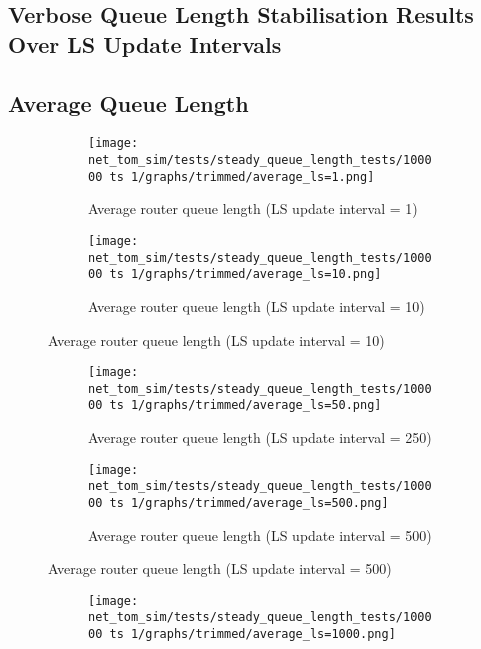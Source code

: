 \begin{appendices}
\chapter{Verbose Queue Length Stabilisation Results Over LS Update Intervals}
\section{Average Queue Length}
    \begin{figure}[h]
        \centering
        \begin{subfigure}[b]{0.475\textwidth}
            \centering
            \texttt{[image: net\_tom\_sim/tests/steady\_queue\_length\_tests/100000 ts 1/graphs/trimmed/average\_ls=1.png]}
            \caption[]{Average router queue length (LS update interval = 1)}
        \end{subfigure}
        \hfill
        \begin{subfigure}[b]{0.475\textwidth}
            \centering
            \texttt{[image: net\_tom\_sim/tests/steady\_queue\_length\_tests/100000 ts 1/graphs/trimmed/average\_ls=10.png]}
            \caption[]{Average router queue length (LS update interval = 10)}
        \end{subfigure}
    \end{figure}
    \begin{figure}[H]\ContinuedFloat
        \centering
        \begin{subfigure}[b]{0.475\textwidth}
            \centering
            \texttt{[image: net\_tom\_sim/tests/steady\_queue\_length\_tests/100000 ts 1/graphs/trimmed/average\_ls=50.png]}
            \caption[]{Average router queue length (LS update interval = 250)}
        \end{subfigure}
        \hfill
        \begin{subfigure}[b]{0.475\textwidth}
            \centering
            \texttt{[image: net\_tom\_sim/tests/steady\_queue\_length\_tests/100000 ts 1/graphs/trimmed/average\_ls=500.png]}
            \caption[]{Average router queue length (LS update interval = 500)}
        \end{subfigure}
    \end{figure}
    \begin{figure}[H]\ContinuedFloat
        \centering
        \begin{subfigure}[t]{0.475\textwidth}
            \centering
            \texttt{[image: net\_tom\_sim/tests/steady\_queue\_length\_tests/100000 ts 1/graphs/trimmed/average\_ls=1000.png]}

\end{subfigure}
\end{figure}
\end{appendices}
